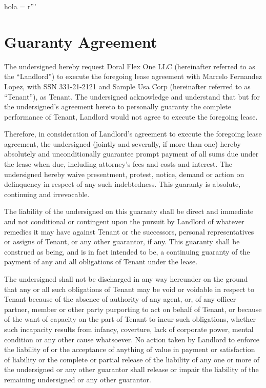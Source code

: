 hola = r'''\documentclass{article}
\newcommand{\company}{Doral Flex One LLC}
\newcommand{\tenant}{Sample Usa Corp}
\newcommand{\tenantpersonalguarantor}{Marcelo Fernandez Lopez}
\newcommand{\guarantorssn}{331-21-2121}
\begin{document}
\part{Guaranty Agreement}
    The undersigned hereby request \company{} (hereinafter referred to as the ``Landlord'') to execute the foregoing lease agreement with \tenantpersonalguarantor, {} with SSN \guarantorssn{} and \tenant{} (hereinafter referred to as ``Tenant''), as Tenant.  The undersigned acknowledge and understand that but for the undersigned’s agreement hereto to personally guaranty the complete performance of Tenant, Landlord would not agree to execute the foregoing lease.

    Therefore, in consideration of Landlord’s agreement to execute the foregoing lease agreement, the undersigned (jointly and severally, if more than one) hereby absolutely and unconditionally guarantee prompt payment of all sums due under the lease when due, including attorney’s fees and costs and interest. The undersigned hereby waive presentment, protest, notice, demand or action on delinquency in respect of any such indebtedness.  This guaranty is absolute, continuing and irrevocable.

    The liability of the undersigned on this guaranty shall be direct and immediate and not conditional or contingent upon the pursuit by Landlord of whatever remedies it may have against Tenant or the successors, personal representatives or assigns of Tenant, or any other guarantor, if any.  This guaranty shall be construed as being, and is in fact intended to be, a continuing guaranty of the payment of any and all obligations of Tenant under the lease.

    The undersigned shall not be discharged in any way hereunder on the ground that any or all such obligations of Tenant may be void or voidable in respect to Tenant because of the absence of authority of any agent, or, of any officer partner, member or other party purporting to act on behalf of Tenant, or because of the want of capacity on the part of Tenant to incur such obligations, whether such incapacity results from infancy, coverture, lack of corporate power, mental condition or any other cause whatsoever.  No action taken by Landlord to enforce the liability of or the acceptance of anything of value in payment or satisfaction of liability or the complete or partial release of the liability of any one or more of the undersigned or any other guarantor shall release or impair the liability of the remaining undersigned or any other guarantor.
\end{document}
